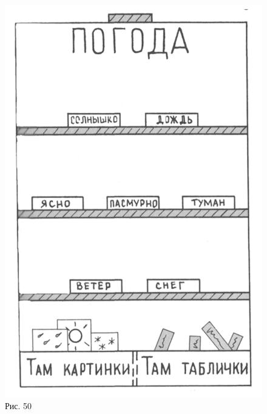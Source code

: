 \documentclass{book}
\begin{document}
\begin{figure}
\centering
\includegraphics[width=0.9\linewidth]{media/media/image46.png}
\caption*{Рис. 50}
\end{figure}
\end{document}
